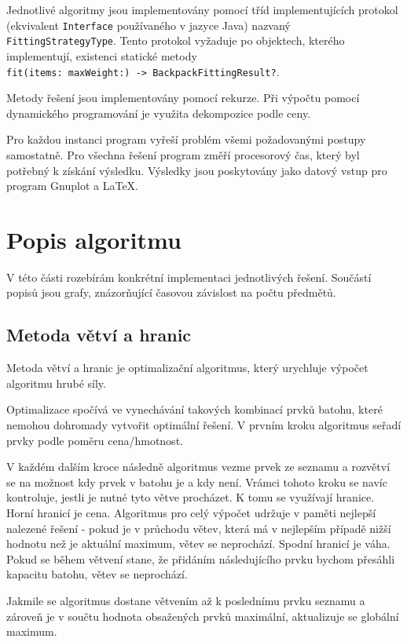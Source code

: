 \documentclass{article}
\begin{document}
Jednotlivé algoritmy jsou implementovány pomocí tříd implementujících protokol (ekvivalent \texttt{Interface} používaného v jazyce Java) nazvaný \texttt{FittingStrategyType}. Tento protokol vyžaduje po objektech, kterého implementují, existenci statické metody\\
\texttt{fit(items: maxWeight:) -> BackpackFittingResult?}.

Metody řešení jsou implementovány pomocí rekurze.
Při výpočtu pomocí dynamického programování je využita dekompozice podle ceny.

Pro každou instanci program vyřeší problém všemi požadovanými postupy samostatně.
Pro všechna řešení program změří procesorový čas, který byl potřebný k získání výsledku.
Výsledky jsou poskytovány jako datový vstup pro program Gnuplot a \LaTeX{}.

\section{Popis algoritmu}

V této části rozebírám konkrétní implementaci jednotlivých řešení.
Součástí popisů jsou grafy, znázorňující časovou závislost na počtu předmětů.

\subsection*{Metoda větví a hranic}

Metoda větví a hranic je optimalizační algoritmus, který urychluje výpočet algoritmu hrubé síly.

Optimalizace spočívá ve vynechávání takových kombinací prvků batohu, které nemohou dohromady vytvořit optimální řešení. V prvním kroku algoritmus seřadí prvky podle poměru cena/hmotnost.

V každém dalším kroce následně algoritmus vezme prvek ze seznamu a rozvětví se na možnost kdy prvek v batohu je a kdy není. Vrámci tohoto kroku se navíc kontroluje, jestli je nutné tyto větve procházet. K tomu se využívají hranice. Horní hranicí je cena. Algoritmus pro celý výpočet udržuje v paměti nejlepší nalezené řešení - pokud je v průchodu větev, která má v nejlepším případě nižší hodnotu než je aktuální maximum, větev se neprochází.
Spodní hranicí je váha. Pokud se během větvení stane, že přidáním následujícího prvku bychom přesáhli kapacitu batohu, větev se neprochází.

Jakmile se algoritmus dostane větvením až k poslednímu prvku seznamu a zároveň je v součtu hodnota obsažených prvků maximální, aktualizuje se globální maximum.
\end{document}

